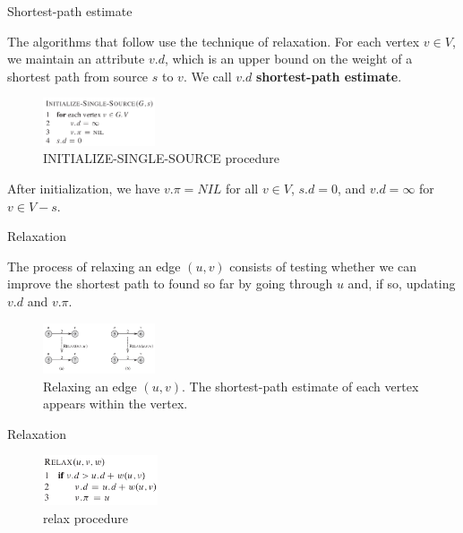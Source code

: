 \documentclass[ignorenonframetext,]{beamer}
\begin{document}
\begin{frame}{Shortest-path estimate}
\protect\hypertarget{shortest-path-estimate}{}

The algorithms that follow use the technique of relaxation. For each
vertex \(v \in V\), we maintain an attribute \(v.d\), which is an upper
bound on the weight of a shortest path from source \(s\) to \(v\). We
call \(v.d\) \textbf{shortest-path estimate}.

\begin{figure}
\centering
\includegraphics[width=1.30208in,height=\textheight]{initialize-single-source.png}
\caption{INITIALIZE-SINGLE-SOURCE procedure}
\end{figure}

After initialization, we have \(v.\pi = NIL\) for all \(v \in V\),
\(s.d = 0\), and \(v.d = \infty\) for \(v \in V - {s}\).

\end{frame}

\begin{frame}{Relaxation}
\protect\hypertarget{relaxation}{}

The process of relaxing an edge \((u, v)\) consists of testing whether
we can improve the shortest path to found so far by going through \(u\)
and, if so, updating \(v.d\) and \(v.\pi\).

\begin{figure}
\centering
\includegraphics[width=1.30208in,height=\textheight]{relax.png}
\caption{Relaxing an edge \((u, v)\). The shortest-path estimate of each
vertex appears within the vertex.}
\end{figure}

\end{frame}

\begin{frame}{Relaxation}
\protect\hypertarget{relaxation-1}{}

\begin{figure}
\centering
\includegraphics[width=1.33333in,height=\textheight]{relax-pseudocode.png}
\caption{relax procedure}
\end{figure}

\end{frame}
\end{document}
